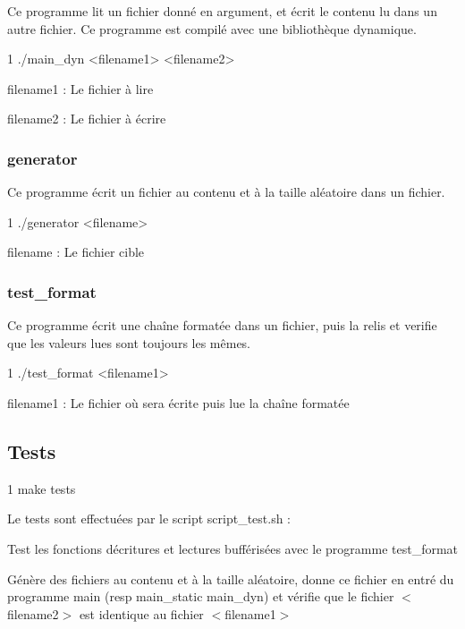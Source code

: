 Ce programme lit un fichier donné en argument, et écrit le contenu lu dans un autre fichier. Ce programme est compilé avec une bibliothèque dynamique.


\begin{DoxyCode}
1 ./main\_dyn <filename1> <filename2>
\end{DoxyCode}

\begin{DoxyItemize}
\item filename1 \+: Le fichier à lire
\item filename2 \+: Le fichier à écrire
\end{DoxyItemize}

\subsubsection*{generator}

Ce programme écrit un fichier au contenu et à la taille aléatoire dans un fichier.


\begin{DoxyCode}
1 ./generator <filename>
\end{DoxyCode}

\begin{DoxyItemize}
\item filename \+: Le fichier cible
\end{DoxyItemize}

\subsubsection*{test\+\_\+format}

Ce programme écrit une chaîne formatée dans un fichier, puis la relis et verifie que les valeurs lues sont toujours les mêmes.


\begin{DoxyCode}
1 ./test\_format <filename1>
\end{DoxyCode}

\begin{DoxyItemize}
\item filename1 \+: Le fichier où sera écrite puis lue la chaîne formatée
\end{DoxyItemize}

\subsection*{Tests}


\begin{DoxyCode}
1 make tests
\end{DoxyCode}


Le tests sont effectuées par le script script\+\_\+test.\+sh \+:
\begin{DoxyItemize}
\item Test les fonctions d\textquotesingle{}écritures et lectures bufférisées avec le programme test\+\_\+format
\item Génère des fichiers au contenu et à la taille aléatoire, donne ce fichier en entré du programme main (resp main\+\_\+static main\+\_\+dyn) et vérifie que le fichier $<$filename2$>$ est identique au fichier $<$filename1$>$ 
\end{DoxyItemize}